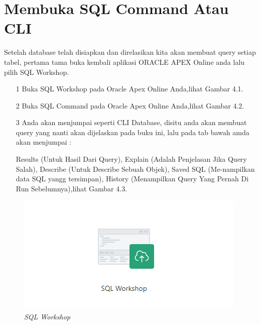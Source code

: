 \section{Membuka SQL Command Atau CLI}
Setelah database telah disiapkan dan direlasikan kita akan membuat query setiap tabel, pertama tama buka kembali aplikasi ORACLE APEX Online anda lalu pilih SQL Workshop.
\begin{itemize}
    \item[1] Buka SQL Workshop pada Oracle Apex Online Anda,lihat Gambar 4.1.
    \item[2] Buka SQL Command pada Oracle Apex Online Anda,lihat Gambar 4.2.
    \item[3] Anda akan menjumpai seperti CLI Database, disitu anda akan membuat query yang nanti akan dijelaskan pada buku ini, lalu pada tab bawah amda akan menjumpai :
    \par Results (Untuk Hasil Dari Query), Explain (Adalah Penjelasan Jika Query Salah), Describe (Untuk Describe Sebuah Objek), Saved SQL (Me-nampilkan data SQL yangg tersimpan), History (Menampilkan Query Yang Pernah Di Run Sebelumnya),lihat Gambar 4.3.      
\end{itemize}

\begin{figure}
        \begin{center}
        \includegraphics[scale=0.5]{figures/sql_wksp.png}
        \caption{\textit{SQL Workshop}}
        \end{center}
        \end{figure}
        
